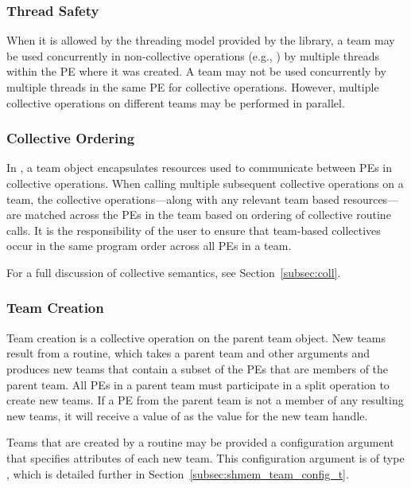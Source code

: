 \subsubsection*{Thread Safety}

When it is allowed by the threading model provided by the \openshmem
library, a team may be used concurrently in non-collective operations
(e.g., ) by multiple threads within the
\ac{PE} where it was created.
A team may not be used concurrently by multiple threads in the same \ac{PE} for
collective operations. However, multiple collective operations on different
teams may be performed in parallel.

\subsubsection*{Collective Ordering}

In \openshmem, a team object encapsulates resources used to communicate
between \acp{PE} in collective operations. When calling multiple subsequent
collective operations on a team, the collective operations---along with any
relevant team based resources---are matched across the \acp{PE} in the team
based on ordering of collective routine calls. It is the responsibility
of the user to ensure that team-based collectives occur in the same program order
across all \acp{PE} in a team.

For a full discussion of collective semantics, see Section~\ref{subsec:coll}.

\subsubsection*{Team Creation}

Team creation is a collective operation on the parent team object. New teams
result from a  routine, which takes a parent team
and other arguments and produces new teams that contain a subset of the \acp{PE}
that are members of the parent
team. All \acp{PE} in a parent team must participate in a split operation
to create new teams. If a \ac{PE} from the parent team is not a member of any
resulting new teams, it will receive a value of 
as the value for the new team handle.

Teams that are created by a  routine may be
provided a configuration argument that specifies attributes of each new team.
This configuration argument is of type , which
is detailed further in Section~\ref{subsec:shmem_team_config_t}.

